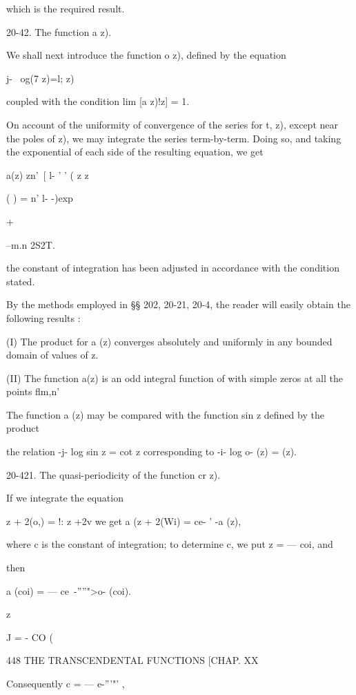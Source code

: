 {which is the required result.

20-42. The function a z).

We shall next introduce the function o z), defined by the equation

j- \ og(7 z)=l; z)

coupled with the condition lim [a z)!z] = 1.

On account of the uniformity of convergence of the series for t, z),
except near the poles of z), we may integrate the series term-by-term.
Doing so, and taking the exponential of each side of the resulting
equation, we get

a(z) zn'\ [ l- ' ' ( z z



( ) = n' l- -)exp



+



--m.n 2S2T.



the constant of integration has been adjusted in accordance with the
condition stated.

By the methods employed in §§ 202, 20-21, 20-4, the reader will easily
obtain the following results :

(I) The product for a (z) converges absolutely and uniformly in any
bounded domain of values of z.

(II) The function a(z) is an odd integral function of with simple
zeros at all the points flm,n'

The function a (z) may be compared with the function sin z defined by
the product

the relation -j- log sin z = cot z corresponding to -i- log o- (z) =
(z).

20-421. The quasi-periodicity of the function cr z).

If we integrate the equation

  z + 2(o,) = !: z +2v we get a (z + 2(Wi) = ce- ' -a (z),

where c is the constant of integration; to determine c, we put z = —
coi, and

then

a (coi) = — ce~-''''">o- (coi).



z

J = - CO (\



448 THE TRANSCENDENTAL FUNCTIONS [CHAP. XX

Consequently c = — e-'''"' ,

}

